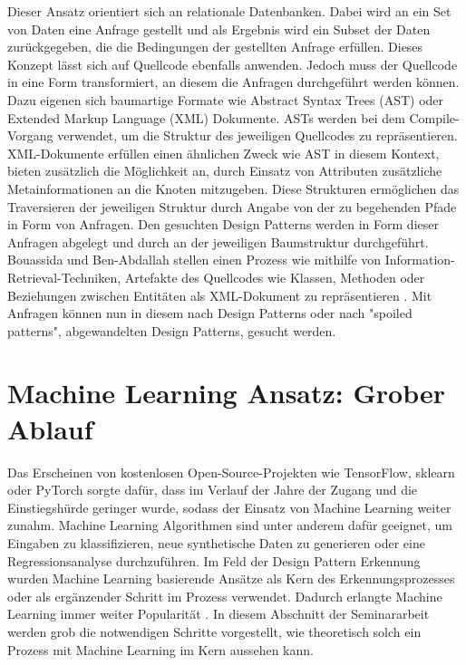 \documentclass[conference]{IEEEtran}
\begin{document}
Dieser Ansatz orientiert sich an relationale Datenbanken. Dabei wird an ein Set von Daten eine Anfrage gestellt und als Ergebnis wird ein Subset der Daten zurückgegeben, die die Bedingungen der gestellten Anfrage erfüllen. Dieses Konzept lässt sich auf Quellcode ebenfalls anwenden.
Jedoch muss der Quellcode in eine Form transformiert, an diesem die Anfragen durchgeführt werden können. Dazu eigenen sich baumartige Formate wie Abstract Syntax Trees (AST) oder Extended Markup Language (XML) Dokumente.
ASTs werden bei dem Compile-Vorgang verwendet, um die Struktur des jeweiligen Quellcodes zu repräsentieren. XML-Dokumente erfüllen einen ähnlichen Zweck wie AST in diesem Kontext,
bieten zusätzlich die Möglichkeit an, durch Einsatz von Attributen zusätzliche Metainformationen an die Knoten mitzugeben. Diese Strukturen ermöglichen das Traversieren der jeweiligen Struktur durch Angabe von der zu begehenden Pfade in Form von Anfragen.
Den gesuchten Design Patterns werden in Form dieser Anfragen abgelegt und durch an der jeweiligen Baumstruktur durchgeführt.
Bouassida und Ben-Abdallah stellen einen Prozess wie mithilfe von Information-Retrieval-Techniken, Artefakte des Quellcodes wie Klassen, Methoden oder Beziehungen zwischen Entitäten als XML-Dokument zu repräsentieren \cite{bouassida2010pattern}.
Mit Anfragen können nun in diesem nach Design Patterns oder nach "spoiled patterns", abgewandelten Design Patterns, gesucht werden.


\newpage

\section{Machine Learning Ansatz: Grober Ablauf}

Das Erscheinen von kostenlosen Open-Source-Projekten wie TensorFlow, sklearn oder PyTorch sorgte dafür, dass im Verlauf der Jahre der Zugang und die Einstiegshürde geringer wurde, sodass der Einsatz von Machine Learning
weiter zunahm. Machine Learning Algorithmen sind unter anderem dafür geeignet, um Eingaben zu klassifizieren, neue synthetische Daten zu generieren oder eine Regressionsanalyse durchzuführen. Im Feld der Design Pattern Erkennung wurden Machine Learning basierende Ansätze als Kern des Erkennungsprozesses oder als ergänzender Schritt im Prozess verwendet. Dadurch erlangte Machine Learning immer weiter Popularität \cite[p. 5805]{Yarahmadi2020}.
In diesem Abschnitt der Seminararbeit werden grob die notwendigen Schritte vorgestellt, wie theoretisch solch ein Prozess mit Machine Learning im Kern aussehen kann.
\end{document}
